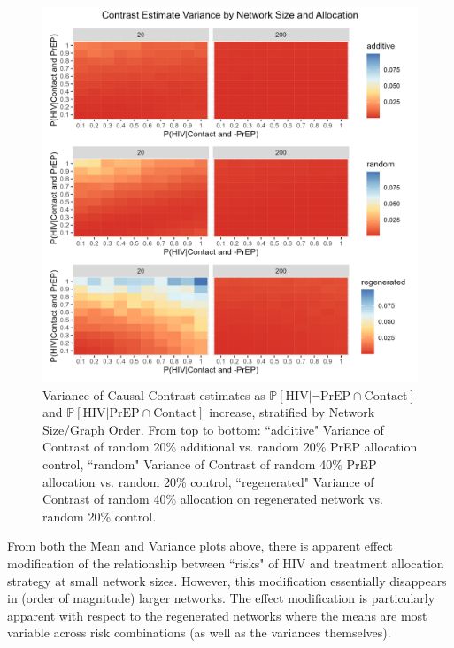 \documentclass{article}
\theoremstyle{definition}
\begin{document}
\begin{figure}[H]
    \centering
    \includegraphics[width=\linewidth]{Figures/Network Size Variance plots.png}
    \caption{Variance of Causal Contrast estimates  as $\mathbb{P}\left[\text{HIV} \vert \neg \text{PrEP} \cap \text{Contact}\right]$ and $\mathbb{P}\left[\text{HIV} \vert \text{PrEP} \cap \text{Contact}\right]$ increase, stratified by Network Size/Graph Order. From top to bottom: ``additive" Variance of Contrast of random 20\% additional vs. random 20\% PrEP allocation control, ``random" Variance of Contrast of random 40\% PrEP allocation vs. random 20\% control, ``regenerated" Variance of Contrast of random 40\% allocation on regenerated network vs. random 20\% control.}
    \label{fig:Figure S4.2}
\end{figure}
From both the Mean and Variance plots above, there is apparent effect modification of the relationship between ``risks" of HIV and treatment allocation strategy at small network sizes. However, this modification essentially disappears in (order of magnitude) larger networks. The effect modification is particularly apparent with respect to the regenerated networks where the means are most variable across risk combinations (as well as the variances themselves).  
\end{document}

